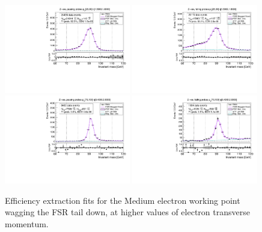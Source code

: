 \begin{figure}
\centering
\includegraphics[width=0.49\textwidth]{figures/Zee_WagFsrDown_BkgLPiEMu_pass_ptBin3_etaBin23.pdf}
\includegraphics[width=0.49\textwidth]{figures/Zee_WagFsrDown_BkgLPiEMu_fail_ptBin3_etaBin23.pdf}
\includegraphics[width=0.49\textwidth]{figures/Zee_WagFsrDown_BkgLPiEMu_pass_ptBin14_etaBin17.pdf}
\includegraphics[width=0.49\textwidth]{figures/Zee_WagFsrDown_BkgLPiEMu_fail_ptBin14_etaBin17.pdf}
\caption{Efficiency extraction fits for the Medium electron working point wagging the FSR tail down, at higher values of electron transverse momentum.}
\label{fig:ZeeAltSigFSRFits4}
\end{figure}


